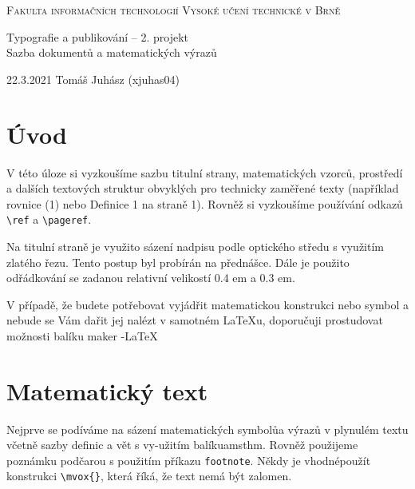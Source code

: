 \documentclass[a4paper, twocolumn,11pt]{article}
\theoremstyle{definition}
\begin{document}
\begin{titlepage}

\begin{center}
\Huge
\textsc{Fakulta informačních technologií
Vysoké učení technické v Brně} \\

\huge
Typografie a publikování -- 2. projekt \\
Sazba dokumentů a matematických výrazů \\
\end{center}

{\LARGE 22.3.2021 \hfill
Tomáš Juhász (xjuhas04)}
\end{titlepage}
\section*{Úvod}
V této úloze si vyzkoušíme sazbu titulní strany, matematických vzorců, prostředí a dalších textových struktur obvyklých pro technicky zaměřené texty (například rovnice (1) nebo Definice 1 na straně 1). Rovněž si vyzkoušíme používání odkazů \verb!\ref! a \verb!\pageref!. 

Na titulní straně je využito sázení nadpisu podle optického středu s využitím zlatého řezu. Tento postup byl probírán na přednášce. Dále je použito odřádkování se zadanou relativní velikostí 0.4 em a 0.3 em. 

V případě, že budete potřebovat vyjádřit matematickou konstrukci nebo symbol a nebude se Vám dařit jej nalézt v samotném \LaTeX u, doporučuji prostudovat možnosti balíku maker \AmS-\LaTeX

\section{Matematický text}
Nejprve se podíváme na sázení matematických symbolůa výrazů v plynulém textu včetně sazby definic a vět s vy-užitím balíkuamsthm. Rovněž použijeme poznámku podčarou s použitím příkazu \verb!footnote!. Někdy je vhodnépoužít konstrukci \verb!\mvox{}!, která říká, že text nemá být zalomen.
\end{document}

